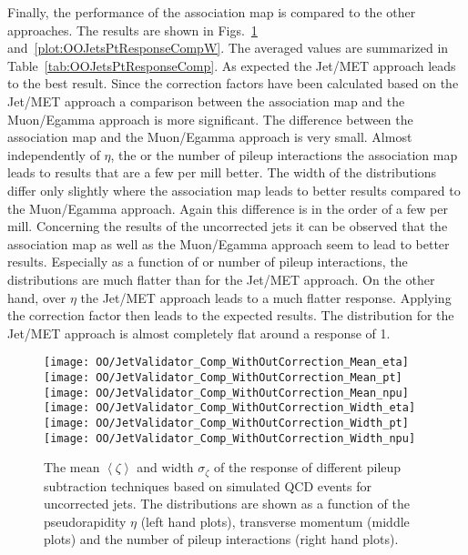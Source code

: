 Finally, the performance of the association map is compared to the other approaches. The results are shown in Figs.~\ref{plot:OOJetsPtResponseCompWO} and~\ref{plot:OOJetsPtResponseCompW}. The averaged values are summarized in Table~\ref{tab:OOJetsPtResponseComp}. As expected the Jet/MET approach leads to the best result. Since the correction factors have been calculated based on the Jet/MET approach a comparison between the association map and the Muon/Egamma approach is more significant. The difference between the association map and the Muon/Egamma approach is very small. Almost independently of $\eta$, the \pt or the number of pileup interactions the association map leads to results that are a few per mill better. The width of the distributions differ only slightly where the association map leads to better results compared to the Muon/Egamma approach. Again this difference is in the order of a few per mill. Concerning the results of the uncorrected jets it can be observed that the association map as well as the Muon/Egamma approach seem to lead to better results. Especially as a function of \pt or number of pileup interactions, the distributions are much flatter than for the Jet/MET approach. On the other hand, over $\eta$ the Jet/MET approach leads to a much flatter \pt{} response. Applying the correction factor then leads to the expected results. The distribution for the Jet/MET approach is almost completely flat around a \pt{} response of 1. 

\begin{figure}[h!t]
  \centering
  \texttt{[image: OO/JetValidator\_Comp\_WithOutCorrection\_Mean\_eta]}
  \texttt{[image: OO/JetValidator\_Comp\_WithOutCorrection\_Mean\_pt]}
  \texttt{[image: OO/JetValidator\_Comp\_WithOutCorrection\_Mean\_npu]}
  \\
  \texttt{[image: OO/JetValidator\_Comp\_WithOutCorrection\_Width\_eta]}
  \texttt{[image: OO/JetValidator\_Comp\_WithOutCorrection\_Width\_pt]}
  \texttt{[image: OO/JetValidator\_Comp\_WithOutCorrection\_Width\_npu]}
  \caption[Mean and width of the \pt{} response for different pileup subtraction techniques based on simulated QCD events for uncorrected jets]{The mean $\left<\zeta\right>$ and width $\sigma_{\zeta}$ of the \pt{} response of different pileup subtraction techniques based on simulated QCD events for uncorrected jets. The distributions are shown as a function of the pseudorapidity $\eta$ (left hand plots), transverse momentum (middle plots) and the number of pileup interactions (right hand plots). \label{plot:OOJetsPtResponseCompWO}}
\end{figure}

